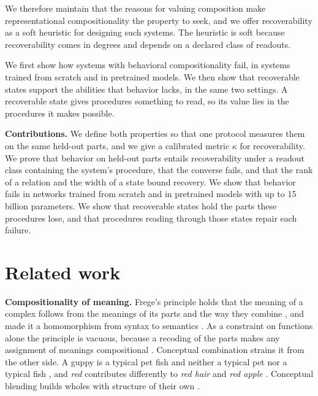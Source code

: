 \documentclass[10pt]{article}
\theoremstyle{plain}
\theoremstyle{remark}
\begin{document}
We therefore maintain that the reasons for valuing composition make representational compositionality the property to seek, and we offer recoverability as a soft heuristic for designing such systems. The heuristic is soft because recoverability comes in degrees and depends on a declared class of readouts.

We first show how systems with behavioral compositionality fail, in systems trained from scratch and in pretrained models. We then show that recoverable states support the abilities that behavior lacks, in the same two settings. A recoverable state gives procedures something to read, so its value lies in the procedures it makes possible.

\textbf{Contributions.} We define both properties so that one protocol measures them on the same held-out parts, and we give a calibrated metric $\kappa$ for recoverability. We prove that behavior on held-out parts entails recoverability under a readout class containing the system's procedure, that the converse fails, and that the rank of a relation and the width of a state bound recovery. We show that behavior fails in networks trained from scratch and in pretrained models with up to 15 billion parameters. We show that recoverable states hold the parts these procedures lose, and that procedures reading through those states repair each failure.

\section{Related work}
\label{sec:related}

\textbf{Compositionality of meaning.} Frege's principle holds that the meaning of a complex follows from the meanings of its parts and the way they combine \citep{frege1923}, and \citet{montague1970} made it a homomorphism from syntax to semantics \citep[see][]{janssen1997}. As a constraint on functions alone the principle is vacuous, because a recoding of the parts makes any assignment of meanings compositional \citep{zadrozny1994}. Conceptual combination strains it from the other side. A guppy is a typical pet fish and neither a typical pet nor a typical fish \citep{osherson1981}, and \emph{red} contributes differently to \emph{red hair} and \emph{red apple} \citep{kamp1995}. Conceptual blending builds wholes with structure of their own \citep{fauconnier2002}.
\end{document}
